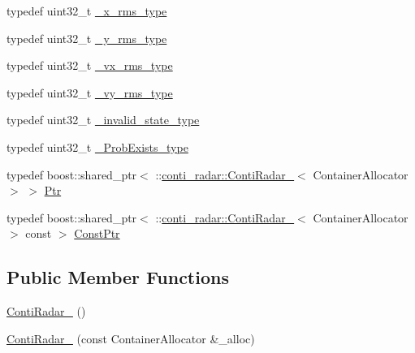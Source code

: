 \begin{DoxyCompactItemize}
\item 
typedef uint32\+\_\+t \hyperlink{structconti__radar_1_1ContiRadar___adcb79fb27779e557e948addd1832938f}{\+\_\+x\+\_\+rms\+\_\+type}
\item 
typedef uint32\+\_\+t \hyperlink{structconti__radar_1_1ContiRadar___ae6571fef76edb2dfe79da331614ddcc5}{\+\_\+y\+\_\+rms\+\_\+type}
\item 
typedef uint32\+\_\+t \hyperlink{structconti__radar_1_1ContiRadar___acae61db5456424612b9f89f891b8f65f}{\+\_\+vx\+\_\+rms\+\_\+type}
\item 
typedef uint32\+\_\+t \hyperlink{structconti__radar_1_1ContiRadar___a25654e54b73dd98b761e31b5fb022d20}{\+\_\+vy\+\_\+rms\+\_\+type}
\item 
typedef uint32\+\_\+t \hyperlink{structconti__radar_1_1ContiRadar___a2a59a60898931fdd385414285db0ddb7}{\+\_\+invalid\+\_\+state\+\_\+type}
\item 
typedef uint32\+\_\+t \hyperlink{structconti__radar_1_1ContiRadar___a130da4dcf3dfa54c90c29a54f91d921c}{\+\_\+\+Prob\+Exists\+\_\+type}
\item 
typedef boost\+::shared\+\_\+ptr$<$ \+::\hyperlink{structconti__radar_1_1ContiRadar__}{conti\+\_\+radar\+::\+Conti\+Radar\+\_\+}$<$ Container\+Allocator $>$ $>$ \hyperlink{structconti__radar_1_1ContiRadar___aa9be4abcc5d49658f43e40444976d22d}{Ptr}
\item 
typedef boost\+::shared\+\_\+ptr$<$ \+::\hyperlink{structconti__radar_1_1ContiRadar__}{conti\+\_\+radar\+::\+Conti\+Radar\+\_\+}$<$ Container\+Allocator $>$ const  $>$ \hyperlink{structconti__radar_1_1ContiRadar___a8a2b8322d7f35af8a6756a33748bf85b}{Const\+Ptr}
\end{DoxyCompactItemize}
\subsection*{Public Member Functions}
\begin{DoxyCompactItemize}
\item 
\hyperlink{structconti__radar_1_1ContiRadar___ae54e31aedc9cc2210f32c6f500fa5b3b}{Conti\+Radar\+\_\+} ()
\item 
\hyperlink{structconti__radar_1_1ContiRadar___a1e7cafdbc1ee94fd920ddcacc48206c2}{Conti\+Radar\+\_\+} (const Container\+Allocator \&\+\_\+alloc)
\end{DoxyCompactItemize}
